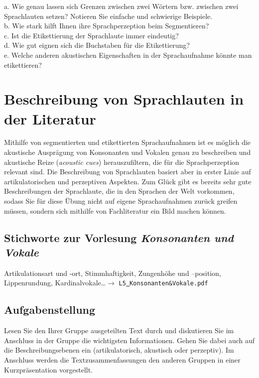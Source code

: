 \documentclass[11pt]{book}
\begin{document}
a.	Wie genau lassen sich Grenzen zwischen zwei Wörtern bzw. zwischen zwei Sprachlauten setzen? Notieren Sie einfache und schwierige Beispiele. \vspace{5cm}\\
b.	Wie stark hilft Ihnen ihre Sprachperzeption beim Segmentieren? \vspace{5cm}\\
\newpage
c.	Ist die Etikettierung der Sprachlaute immer eindeutig? \vspace{5cm}\\
d.	Wie gut eignen sich die Buchstaben für die Etikettierung? \vspace{5cm}\\
e.	Welche anderen akustischen Eigenschaften in der Sprachaufnahme könnte man etikettieren? \vspace*{5cm}\\






\chapter{Beschreibung von Sprachlauten in der Literatur}

Mithilfe von segmentierten und etikettierten Sprachaufnahmen ist es möglich die akustische Ausprägung von Konsonanten und Vokalen genau zu beschreiben und akustische Reize (\emph{acoustic cues}) herauszufiltern, die für die Sprachperzeption relevant sind. Die Beschreibung von Sprachlauten basiert aber in erster Linie auf artikulatorischen und perzeptiven Aspekten. Zum Glück gibt es bereits sehr gute Beschreibungen der Sprachlaute, die in den Sprachen der Welt vorkommen, sodass Sie für diese Übung nicht auf eigene Sprachaufnahmen zurück greifen müssen, sondern sich mithilfe von Fachliteratur ein Bild machen können.

\section{Stichworte zur Vorlesung \em{Konsonanten und Vokale}}
Artikulationsart und -ort, Stimmhaftigkeit, Zungenhöhe und –position, Lippenrundung, Kardinalvokale\dots $\rightarrow$ {\tt L5\underline{\ }Konsonanten{\&}Vokale.pdf}

\section{Aufgabenstellung}
Lesen Sie den Ihrer Gruppe ausgeteilten Text durch und diskutieren Sie im Anschluss in der Gruppe die wichtigsten Informationen. Gehen Sie dabei auch auf die Beschreibungsebenen ein (artikulatorisch, akustisch oder perzeptiv). Im Anschluss werden die Textzusammenfassungen den anderen Gruppen in einer Kurzpräsentation vorgestellt.
\newline
\end{document}
